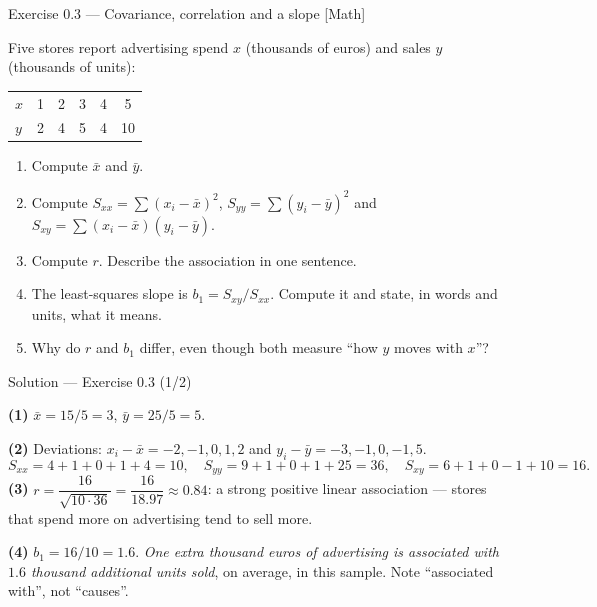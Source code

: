 \documentclass[aspectratio=169,11pt]{beamer}
\begin{document}
\begin{frame}{Exercise 0.3 --- Covariance, correlation and a slope [Math]}
  \begin{exercise}
    Five stores report advertising spend $x$ (thousands of euros) and sales
    $y$ (thousands of units):
    \begin{center}\footnotesize
    \begin{tabular}{@{}lccccc@{}}
      \toprule
      $x$ & 1 & 2 & 3 & 4 & 5 \\
      $y$ & 2 & 4 & 5 & 4 & 10 \\
      \bottomrule
    \end{tabular}
    \end{center}
    \begin{enumerate}
      \item Compute $\bar x$ and $\bar y$.
      \item Compute $S_{xx} = \sum (x_i-\bar x)^2$,
            $S_{yy} = \sum (y_i-\bar y)^2$ and
            $S_{xy} = \sum (x_i-\bar x)(y_i-\bar y)$.
      \item Compute $r$. Describe the association in one sentence.
      \item The least-squares slope is $b_1 = S_{xy}/S_{xx}$. Compute it and
            state, in words and units, what it means.
      \item Why do $r$ and $b_1$ differ, even though both measure ``how $y$
            moves with $x$''?
    \end{enumerate}
  \end{exercise}
\end{frame}

\begin{frame}{Solution --- Exercise 0.3 (1/2)}
  \begin{solutionbox}
    \textbf{(1)} $\bar x = 15/5 = 3$, \quad $\bar y = 25/5 = 5$.

    \textbf{(2)} Deviations: $x_i - \bar x = -2,-1,0,1,2$ and
    $y_i - \bar y = -3,-1,0,-1,5$.
    \[
      S_{xx} = 4+1+0+1+4 = 10, \quad
      S_{yy} = 9+1+0+1+25 = 36, \quad
      S_{xy} = 6+1+0-1+10 = 16 .
    \]
    \textbf{(3)} $r = \dfrac{16}{\sqrt{10\cdot 36}} = \dfrac{16}{18.97}
    \approx 0.84$: a strong positive linear association --- stores that spend
    more on advertising tend to sell more.

    \textbf{(4)} $b_1 = 16/10 = 1.6$. \emph{One extra thousand euros of
    advertising is associated with $1.6$ thousand additional units sold},
    on average, in this sample. Note ``associated with'', not ``causes''.
  \end{solutionbox}
\end{frame}
\end{document}
